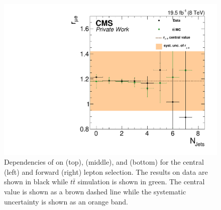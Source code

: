 \begin{figure}[htbp]
\begin{minipage}[t]{0.49\textwidth}
\includegraphics[width=\textwidth]{plots/BG/rmue/rMuE_ZPeakControlForward_Full2012_NJets_None.pdf}
\end{minipage}
\caption{Dependencies of \rmue on \mll (top), \MET (middle), and \njets (bottom) for the central (left) and forward (right) lepton selection. The results on data are shown in black while $t\bar{t}$ simulation is shown in green. The central value is shown as a brown dashed line while the systematic uncertainty is shown as an orange band.}
\label{fig:rmueDependencies}
\end{figure} 
